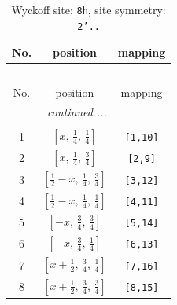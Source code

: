 \documentclass[fleqn,8pt]{jsarticle}
\begin{document}
\begin{longtable}{ccc}
\caption{Wyckoff site: {\tt 8h}, site symmetry: {\tt 2'..}}
 \\
 \hline \hline
No. & position & mapping \\ \hline \endfirsthead

\multicolumn{2}{l}{\tablename\ \thetable{}} \\
 \hline \hline
No. & position & mapping \\ \hline \endhead

 \hline \hline
\multicolumn{2}{r}{\footnotesize\it continued ...} \\ \endfoot

 \hline \hline
\multicolumn{2}{r}{} \\ \endlastfoot

1 & $\left[ x,\, \frac{1}{4},\, \frac{1}{4} \right]$ & {\tt [1,10]} \\ \hline
2 & $\left[ x,\, \frac{1}{4},\, \frac{3}{4} \right]$ & {\tt [2,9]} \\ \hline
3 & $\left[ \frac{1}{2} - x,\, \frac{1}{4},\, \frac{3}{4} \right]$ & {\tt [3,12]} \\ \hline
4 & $\left[ \frac{1}{2} - x,\, \frac{1}{4},\, \frac{1}{4} \right]$ & {\tt [4,11]} \\ \hline
5 & $\left[ - x,\, \frac{3}{4},\, \frac{3}{4} \right]$ & {\tt [5,14]} \\ \hline
6 & $\left[ - x,\, \frac{3}{4},\, \frac{1}{4} \right]$ & {\tt [6,13]} \\ \hline
7 & $\left[ x + \frac{1}{2},\, \frac{3}{4},\, \frac{1}{4} \right]$ & {\tt [7,16]} \\ \hline
8 & $\left[ x + \frac{1}{2},\, \frac{3}{4},\, \frac{3}{4} \right]$ & {\tt [8,15]} \\
\end{longtable}
\renewcommand{\arraystretch}{1.2}
\end{document}
